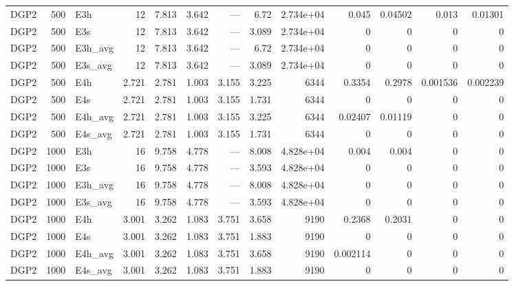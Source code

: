 \begin{tiny}
\begin{longtable}{lrlrrrrrrrrrr}
DGP2 & 500 & E3h & 12 & 7.813 & 3.642 & --- & 6.72 & 2.734e+04 & 0.045 & 0.04502 & 0.013 & 0.01301 \\
DGP2 & 500 & E3s & 12 & 7.813 & 3.642 & --- & 3.089 & 2.734e+04 & 0 & 0 & 0 & 0 \\
DGP2 & 500 & E3h_avg & 12 & 7.813 & 3.642 & --- & 6.72 & 2.734e+04 & 0 & 0 & 0 & 0 \\
DGP2 & 500 & E3s_avg & 12 & 7.813 & 3.642 & --- & 3.089 & 2.734e+04 & 0 & 0 & 0 & 0 \\
DGP2 & 500 & E4h & 2.721 & 2.781 & 1.003 & 3.155 & 3.225 & 6344 & 0.3354 & 0.2978 & 0.001536 & 0.002239 \\
DGP2 & 500 & E4s & 2.721 & 2.781 & 1.003 & 3.155 & 1.731 & 6344 & 0 & 0 & 0 & 0 \\
DGP2 & 500 & E4h_avg & 2.721 & 2.781 & 1.003 & 3.155 & 3.225 & 6344 & 0.02407 & 0.01119 & 0 & 0 \\
DGP2 & 500 & E4s_avg & 2.721 & 2.781 & 1.003 & 3.155 & 1.731 & 6344 & 0 & 0 & 0 & 0 \\
DGP2 & 1000 & E3h & 16 & 9.758 & 4.778 & --- & 8.008 & 4.828e+04 & 0.004 & 0.004 & 0 & 0 \\
DGP2 & 1000 & E3s & 16 & 9.758 & 4.778 & --- & 3.593 & 4.828e+04 & 0 & 0 & 0 & 0 \\
DGP2 & 1000 & E3h_avg & 16 & 9.758 & 4.778 & --- & 8.008 & 4.828e+04 & 0 & 0 & 0 & 0 \\
DGP2 & 1000 & E3s_avg & 16 & 9.758 & 4.778 & --- & 3.593 & 4.828e+04 & 0 & 0 & 0 & 0 \\
DGP2 & 1000 & E4h & 3.001 & 3.262 & 1.083 & 3.751 & 3.658 & 9190 & 0.2368 & 0.2031 & 0 & 0 \\
DGP2 & 1000 & E4s & 3.001 & 3.262 & 1.083 & 3.751 & 1.883 & 9190 & 0 & 0 & 0 & 0 \\
DGP2 & 1000 & E4h_avg & 3.001 & 3.262 & 1.083 & 3.751 & 3.658 & 9190 & 0.002114 & 0 & 0 & 0 \\
DGP2 & 1000 & E4s_avg & 3.001 & 3.262 & 1.083 & 3.751 & 1.883 & 9190 & 0 & 0 & 0 & 0 \\
\end{longtable}
\end{tiny}
